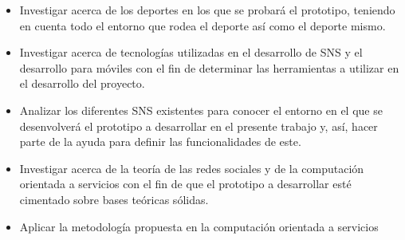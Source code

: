 \begin{itemize}
  \item Investigar acerca de los deportes en los que se probará el prototipo, teniendo en cuenta todo el entorno que rodea el deporte así como el deporte mismo.

  \item Investigar acerca de tecnologías utilizadas en el desarrollo de SNS y el desarrollo para móviles con el fin de determinar las herramientas a utilizar en el
desarrollo del proyecto.

  \item Analizar los diferentes SNS existentes para conocer el entorno en el que se desenvolverá el prototipo a desarrollar en el presente trabajo y, así, hacer parte
de la ayuda para definir las funcionalidades de este.

  \item Investigar acerca de la teoría de las redes sociales y de la computación orientada a servicios con el fin de que el prototipo a desarrollar esté cimentado sobre
bases teóricas sólidas.

  \item Aplicar la metodología propuesta en la computación orientada a servicios
\end{itemize}
